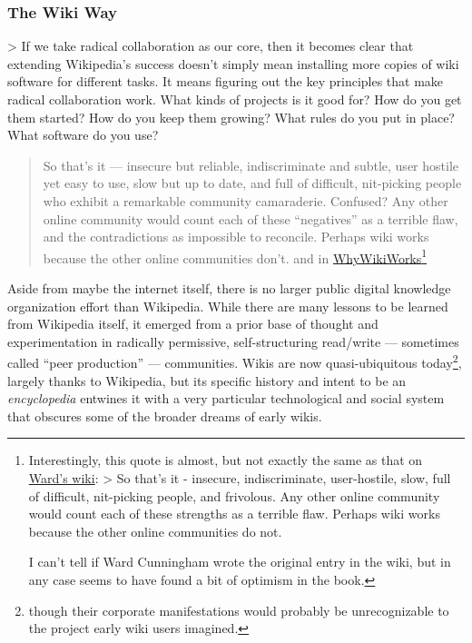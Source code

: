 \documentclass[10pt]{article}
\begin{document}
\hypertarget{the-wiki-way}{%
\subsubsection{The Wiki Way}\label{the-wiki-way}}


\begin{multicols}{2}
 \textgreater{} If we take radical collaboration as our
core, then it becomes clear that extending Wikipedia's success doesn't
simply mean installing more copies of wiki software for different tasks.
It means figuring out the key principles that make radical collaboration
work. What kinds of projects is it good for? How do you get them
started? How do you keep them growing? What rules do you put in place?
What software do you use? \cite{swartzMakingMoreWikipedias2006} 

\begin{quote}
So that's it --- insecure but reliable, indiscriminate and subtle, user
hostile yet easy to use, slow but up to date, and full of difficult,
nit-picking people who exhibit a remarkable community camaraderie.
Confused? Any other online community would count each of these
``negatives'' as a terrible flaw, and the contradictions as impossible
to reconcile. Perhaps wiki works because the other online communities
don't. \cite{leufWikiWayQuick2001a, -l, 329}  and in
\href{http://wiki.c2.com/?WhyWikiWorks}{WhyWikiWorks}\footnote{Interestingly,
  this quote is almost, but not exactly the same as that on
  \href{http://wiki.c2.com/?WhyWikiWorks}{Ward's wiki}: \textgreater{}
  So that's it - insecure, indiscriminate, user-hostile, slow, full of
  difficult, nit-picking people, and frivolous. Any other online
  community would count each of these strengths as a terrible flaw.
  Perhaps wiki works because the other online communities do not.

  I can't tell if Ward Cunningham wrote the original entry in the wiki,
  but in any case seems to have found a bit of optimism in the book.}
\end{quote}

Aside from maybe the internet itself, there is no larger public digital
knowledge organization effort than Wikipedia. While there are many
lessons to be learned from Wikipedia itself, it emerged from a prior
base of thought and experimentation in radically permissive,
self-structuring read/write --- sometimes called ``peer production''
\cite{hillWikipediaEndOpen2019}  --- communities. Wikis are now
quasi-ubiquitous today\footnote{though their corporate manifestations
  would probably be unrecognizable to the project early wiki users
  imagined.}, largely thanks to Wikipedia, but its specific history and
intent to be an \emph{encyclopedia} entwines it with a very particular
technological and social system that obscures some of the broader dreams
of early wikis.


\end{multicols}
\end{document}
